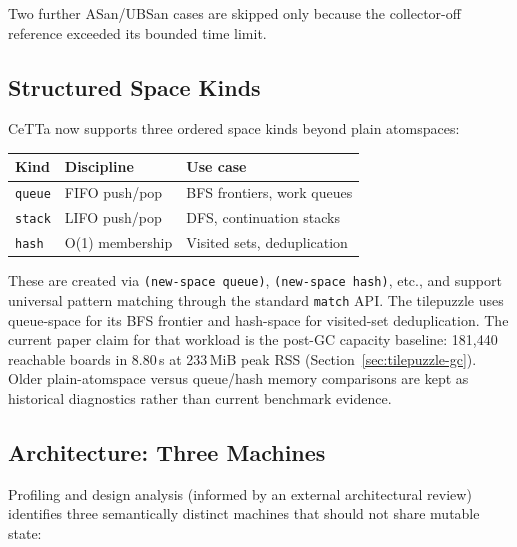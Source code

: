 \documentclass[11pt]{article}
\newcommand{\code}[1]{\texttt{#1}}
\newcommand{\CeTTa}{\textup{CeTTa}}
\begin{document}
\noindent Two further ASan/UBSan cases are skipped only because the
collector-off reference exceeded its bounded time limit.

\subsection{Structured Space Kinds}

\CeTTa{} now supports three ordered space kinds beyond plain atomspaces:

\begin{center}
\begin{tabular}{lll}
\toprule
Kind & Discipline & Use case \\
\midrule
\code{queue} & FIFO push/pop & BFS frontiers, work queues \\
\code{stack} & LIFO push/pop & DFS, continuation stacks \\
\code{hash} & O(1) membership & Visited sets, deduplication \\
\bottomrule
\end{tabular}
\end{center}

These are created via \code{(new-space queue)}, \code{(new-space hash)},
etc., and support universal pattern matching through the standard
\code{match} API\@.  The tilepuzzle uses queue-space for its BFS
frontier and hash-space for visited-set deduplication.  The current
paper claim for that workload is the post-GC capacity baseline:
181{,}440 reachable boards in 8.80\,s at 233\,MiB peak RSS
(Section~\ref{sec:tilepuzzle-gc}).  Older plain-atomspace versus
queue/hash memory comparisons are kept as historical diagnostics rather
than current benchmark evidence.

\subsection{Architecture: Three Machines}

Profiling and design analysis (informed by an external architectural
review) identifies three semantically distinct machines that should
not share mutable state:
\end{document}

